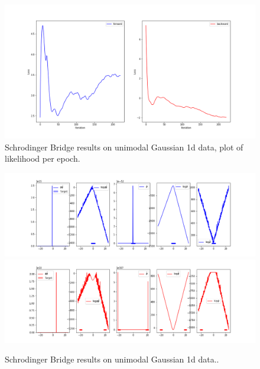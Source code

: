 \documentclass[a4paper,12pt,twoside,openright]{report}
\theoremstyle{definition}
\begin{document}
\begin{figure}
    \centering
    \includegraphics[scale=0.47,trim={4.3cm 1cm 2.5cm 0}, clip]{images/Pavon/pavon convergence big var.png} \vspace{-0.6cm}
    \caption{Schrodinger Bridge results on unimodal Gaussian 1d data, plot of likelihood per epoch. }
    \label{fig:small_to_big_convergence}
\end{figure}
\begin{figure}[t]
    \centering
    \includegraphics[scale=0.45,trim={4.3cm 0.2cm 1.5cm 0}, clip]{images/Pavon/Forward_unimodal_test_working_convex.png} \\\vspace{-0.2cm}
    \includegraphics[scale=0.45,trim={4.3cm 0 1.5cm 1.5cm}, clip]{images/Pavon/Backward_unimodal_test_working_convex.png} 
    \caption{Schrodinger Bridge results on unimodal Gaussian 1d data.. }
    \label{fig:small_delta_collapse}
\end{figure}
\end{document}
